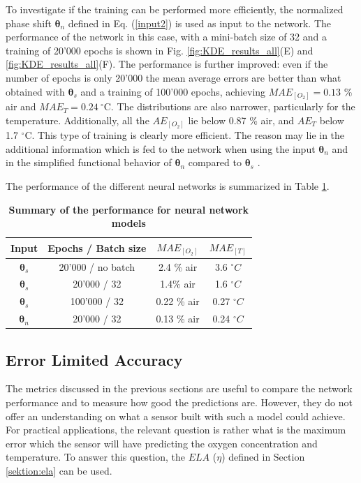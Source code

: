 \documentclass[sensors,article,submit,moreauthors,pdftex,10pt,a4paper]{Definitions/mdpi}
\begin{document}
To investigate if the training can be performed more efficiently, the normalized phase shift ${\pmb \theta}_n$ defined in Eq. (\ref{input2}) is used as input to the network. The performance of the network in this case, with a mini-batch size of 32 and a training of 20'000 epochs is shown in Fig. \ref{fig:KDE_results_all}(E) and \ref{fig:KDE_results_all}(F). The performance is further improved: even if the number of epochs is only 20'000 the mean average errors are better than what obtained with ${\pmb \theta}_s$ and a training of 100'000 epochs, achieving $MAE_{[O_2]}=0.13$ \% air and $MAE_{T}=0.24 \ ^\circ$C. The distributions are also narrower, particularly for the temperature. Additionally, all the $AE_{[O_2]}$ lie below 0.87 \% air, and  $AE_{T}$ below 1.7 $^\circ$C. This type of training is clearly more efficient. The reason may lie in the additional information which is fed to the network when using the input ${\pmb \theta}_n$ and in the simplified functional behavior of ${\pmb \theta}_n$ compared to ${\pmb \theta}_s$ \cite{Michelucci2019_2}.


The performance of the different neural networks is summarized in Table \ref{TableMAE_summary}. 
\begin{table}[hbt]
\centering
\caption {\bf Summary of the performance for neural network models}

\begin{tabular}{ cccc}
\smallskip 
 Input & Epochs / Batch size & $MAE_{[O_2]}$ & $MAE_{[T]}$  \\ 
 \hline
${\pmb \theta}_s$ & 20'000 / \textrm{no batch} & 2.4 \% air & 3.6 $^\circ C$\\ 
${\pmb \theta}_s$ & 20'000 / 32 & 1.4\% air & 1.6 $^\circ C$\\ 
${\pmb \theta}_s$& 100'000 / 32 & 0.22 \% air & 0.27 $^\circ C$\\ 
${\pmb \theta}_n$ & 20'000 / 32 & 0.13 \% air & 0.24 $^\circ C$\\ 
\end{tabular}
\label{TableMAE_summary}
\end{table}


\subsection{Error Limited Accuracy}

The metrics discussed in the previous sections are useful to compare the network performance and to measure how good the predictions are. However, they do not offer an understanding on what a sensor built with such a model could achieve. For practical applications, the relevant question is rather what is the maximum error which the sensor will have predicting the oxygen concentration and temperature. To answer this question, the $ELA$ ($\eta$) defined in Section \ref{sektion:ela} can be used. 
\end{document}
